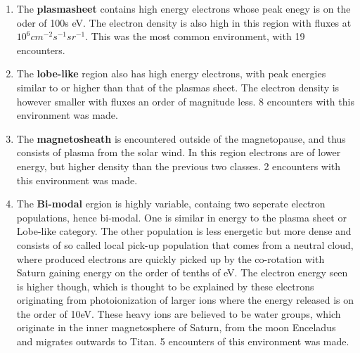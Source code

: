 \documentclass[12pt, parskip=full*, abstract]{scrartcl}
\begin{document}
\begin{enumerate}
	\item The \textbf{plasmasheet} contains high energy electrons whose peak enegy is on the oder of 100s eV. The electron density is also high in this region with fluxes at $10^6cm^{-2}s^{-1}sr^{-1}$. This was the most common environment, with 19 encounters.
	\item The \textbf{lobe-like} region also has high energy electrons, with peak energies similar to or higher than that of the plasmas sheet. The electron density is however smaller with fluxes an order of magnitude less. 8 encounters with this environment was made.
	\item The \textbf{magnetosheath} is encountered outside of the magnetopause, and thus consists of plasma from the solar wind. In this region electrons are of lower energy, but higher density than the previous two classes. 2 encounters with this environment was made.
	\item The \textbf{Bi-modal} ergion is highly variable, containg two seperate electron populations, hence bi-modal. One is similar in energy to the plasma sheet or Lobe-like category. The other population is less energetic but more dense and consists of so called local pick-up population that comes from a neutral cloud, where produced electrons are quickly picked up by the co-rotation with Saturn gaining energy on the order of tenths of eV. The electron energy seen is higher though, which is thought to be explained by these electrons originating from photoionization of larger ions where the energy released is on the order of 10eV. These heavy ions are believed to be water groups, which originate in the inner magnetosphere of Saturn, from the moon Enceladus and migrates outwards to Titan. 5 encounters of this environment was made.

\end{enumerate}
\end{document}
